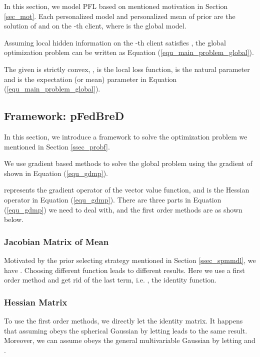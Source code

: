 \documentclass{article}
\begin{document}
In this section, we model PFL based on mentioned motivation in Section \ref{sec_mot}. Each personalized model  and personalized mean of prior are the solution of  and  on the -th client, where  is the global model.

Assuming local hidden information on the -th client satisfies 
 , the global optimization problem can be written as Equation (\ref{equ_main_problem_global}).

The given  is strictly convex, ,  is the local loss function,  is the natural parameter and  is the expectation (or mean) parameter in Equation (\ref{equ_main_problem_global}).

\subsection{Framework: pFedBreD}
\label{ssec_framework}

In this section, we introduce a framework to solve the optimization problem we mentioned in Section \ref{ssec_probf}.

We use gradient based methods to solve the global problem using the gradient of  shown in Equation (\ref{equ_gdmp}).

 represents the gradient operator of the vector value function, and  is the Hessian operator in Equation (\ref{equ_gdmp}).
There are three parts in Equation (\ref{equ_gdmp}) we need to deal with, and the first order methods are as shown below.

\subsubsection{Jacobian Matrix of Mean}
\label{sssec_alg_jmm}

Motivated by the prior selecting strategy mentioned in Section \ref{ssec_spmmdl}, we have . Choosing different function  leads to different results. Here we use a first order method and get rid of the last term, i.e. , the identity function.

\subsubsection{Hessian Matrix}
\label{sssec_alg_hm}

To use the first order methods, we directly let   the identity matrix. It happens that assuming  obeys the spherical Gaussian by letting  leads to the same result. Moreover, we can assume  obeys the general multivariable Gaussian by letting  and .
\end{document}
